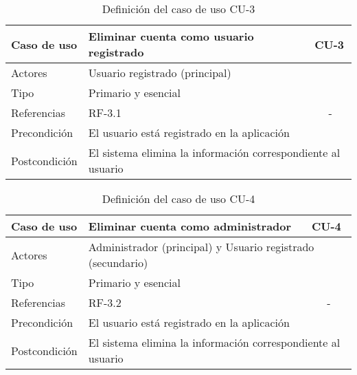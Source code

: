\begin{table}[H]
    \begin{tabular}{|p{3cm}|p{5cm}|p{2cm}|}
        \hline
        Caso de uso & Eliminar cuenta como usuario registrado & CU-3 \\
        \hline
        Actores & \multicolumn{2}{|p{7cm}|}{Usuario registrado (principal)} \\
        \hline
        Tipo & \multicolumn{2}{|p{7cm}|}{Primario y esencial} \\
        \hline
        Referencias & RF-3.1 & \multicolumn{1}{|c|}{-} \\
        \hline
        Precondición & \multicolumn{2}{|p{7cm}|}{El usuario está registrado
        en la aplicación} \\
        \hline
        Postcondición & \multicolumn{2}{|p{7cm}|}{El sistema elimina la información
        correspondiente al usuario} \\
        \hline
    \end{tabular}
    \caption{Definición del caso de uso CU-3}
    \label{tab:cu_3}
\end{table}

\begin{table}[H]
    \begin{tabular}{|p{3cm}|p{5cm}|p{2cm}|}
        \hline
        Caso de uso & Eliminar cuenta como administrador & CU-4 \\
        \hline
        Actores & \multicolumn{2}{|p{7cm}|}{Administrador (principal)
        y Usuario registrado (secundario)} \\
        \hline
        Tipo & \multicolumn{2}{|p{7cm}|}{Primario y esencial} \\
        \hline
        Referencias & RF-3.2 & \multicolumn{1}{|c|}{-} \\
        \hline
        Precondición & \multicolumn{2}{|p{7cm}|}{El usuario está registrado
        en la aplicación} \\
        \hline
        Postcondición & \multicolumn{2}{|p{7cm}|}{El sistema elimina la información
        correspondiente al usuario} \\
        \hline
    \end{tabular}
    \caption{Definición del caso de uso CU-4}
    \label{tab:cu_4}
\end{table}

